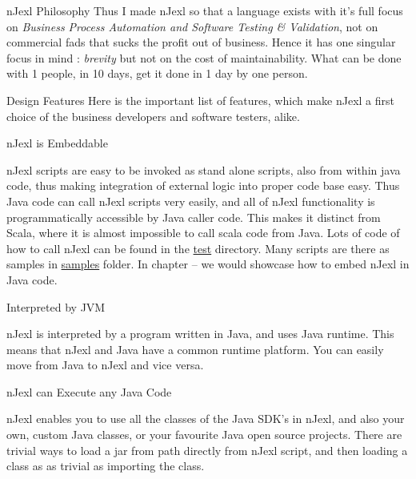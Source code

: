 \begin{section}{nJexl Philosophy}
Thus I made nJexl so that a language exists with it's full focus on \emph{Business Process Automation and Software Testing \& Validation},
not on commercial fads that sucks the profit out of business. Hence it has one singular focus in mind : \emph{brevity} but not on the cost of maintainability. What can be done with 1 people, in 10 days, get it done in 1 day by one person.

\end{section}

\begin{section}{Design Features}
Here is the important list of features, which make nJexl a first choice of the business developers and software testers, alike.

\begin{subsection}{nJexl is Embeddable}

nJexl scripts are easy to be invoked as stand alone scripts, also from within java code, 
thus making integration of external logic into proper code base easy. Thus Java code
can call nJexl scripts very easily, and all of nJexl functionality is programmatically 
accessible by Java caller code. This makes it distinct from Scala, where it is almost impossible
to call scala code from Java. Lots of code of how to call nJexl can be found 
in the \href{https://github.com/nmondal/njexl/tree/master/lang/src/test/java/com/noga/njexl/lang}{test} directory. 
Many scripts are there as samples in \href{https://github.com/nmondal/njexl/tree/master/lang/samples}{samples} folder.
In chapter -- we would showcase how to embed nJexl in Java code.
\end{subsection}

\begin{subsection}{Interpreted by JVM}

nJexl is interpreted by a program written in Java, and uses Java runtime. 
This means that nJexl and Java have a common runtime platform. 
You can easily move from Java to nJexl and vice versa.

\end{subsection}

\begin{subsection}{nJexl can Execute any Java Code}

nJexl enables you to use all the classes of the Java SDK's in nJexl, and also your own, custom Java classes, or your favourite Java open source projects. There are trivial ways to load a jar from path directly from nJexl script, and then loading a class as as trivial 
as importing the class.


\end{subsection}
\end{section}
